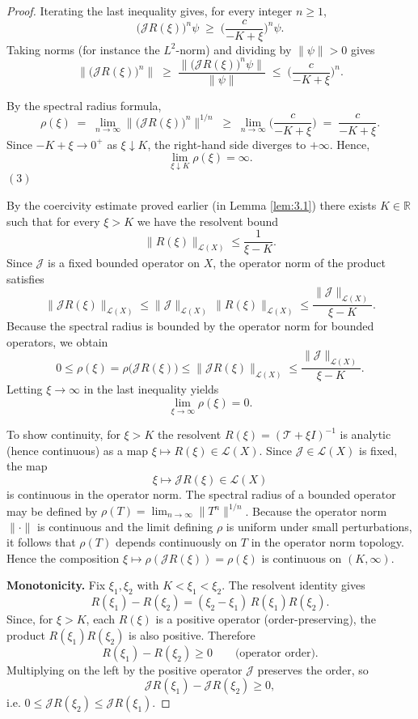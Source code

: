 \documentclass[a4paper,11pt]{amsart}
\theoremstyle{definition}
\numberwithin{equation}{section}
\theoremstyle{definition}
\begin{document}
\begin{proof}
\smallskip

Iterating the last inequality gives, for every integer \(n\geq1\),
\[
\big(\mathscr J R(\xi)\big)^n \psi \;\geq\; \Big(\frac{c}{-K+\xi}\Big)^n \psi.
\]
Taking norms (for instance the \(L^2\)-norm) and dividing by \(\|\psi\|>0\) gives
\[
\big\|\big(\mathscr J R(\xi)\big)^n\big\|
\;\geq\; \frac{\big\|\big(\mathscr J R(\xi)\big)^n\psi\big\|}{\|\psi\|}
\;\leq\; \Big(\frac{c}{-K+\xi}\Big)^n .
\]

 By the spectral radius formula,
\[
\rho(\xi) \;=\; \lim_{n\to\infty} \big\|\big(\mathscr J R(\xi)\big)^n\big\|^{1/n}
\;\geq\; \lim_{n\to\infty} \Big(\frac{c}{-K+\xi}\Big) \;=\; \frac{c}{-K+\xi}.
\]
Since \(-K+\xi\to 0^+\) as \(\xi\downarrow K\), the right-hand side diverges to \(+\infty\).
Hence,
\[
\lim_{\xi\downarrow K} \rho(\xi) = \infty.
\]
 $(3)$


By the coercivity estimate proved earlier (in Lemma \eqref{lem:3.1}) there exists $K\in\mathbb R$ such that for every $\xi>K$ we have the resolvent bound
\[
\|R(\xi)\|_{\mathcal L(X)} \leq \frac{1}{\xi-K}.
\]
Since $\mathscr J$ is a fixed bounded operator on $X$, the operator norm of the product satisfies
\[
\|\mathscr J R(\xi)\|_{\mathcal L(X)} \leq \|\mathscr J\|_{\mathcal L(X)} \,\|R(\xi)\|_{\mathcal L(X)}
\leq \frac{\|\mathscr J\|_{\mathcal L(X)}}{\xi-K}.
\]
Because the spectral radius is bounded by the operator norm for bounded operators, we obtain
\[
0 \le \rho(\xi) = \rho\!\big(\mathscr J R(\xi)\big) \leq \|\mathscr J R(\xi)\|_{\mathcal L(X)}
\leq \frac{\|\mathscr J\|_{\mathcal L(X)}}{\xi-K}.
\]
Letting $\xi\to\infty$ in the last inequality yields
\[
\lim_{\xi\to\infty}\rho(\xi)=0.
\]


To  show continuity, for $\xi>K$ the resolvent $R(\xi)=(\mathscr T+\xi I)^{-1}$ is analytic (hence continuous) as a map
\(\xi\mapsto R(\xi)\in\mathcal L(X)\). Since $\mathscr J\in\mathcal L(X)$ is fixed, the map
\[
\xi \longmapsto \mathscr J R(\xi) \in \mathcal L(X)
\]
is continuous in the operator norm. The spectral radius of a bounded operator may be defined by
\(\rho(T)=\lim_{n\to\infty}\|T^n\|^{1/n}\). Because the operator norm \(\|\cdot\|\) is continuous and the
limit defining \(\rho\) is uniform under small perturbations, it follows that \(\rho(T)\) depends continuously
on \(T\) in the operator norm topology. Hence the composition \(\xi\mapsto\rho(\mathscr J R(\xi))=\rho(\xi)\)
is continuous on \((K,\infty)\).

\medskip
\noindent\textbf{Monotonicity.}
Fix \(\xi_1,\xi_2\) with \(K<\xi_1<\xi_2\). The resolvent identity gives
\[
R(\xi_1)-R(\xi_2) = (\xi_2-\xi_1)\,R(\xi_1)R(\xi_2).
\]
Since, for \(\xi>K\), each \(R(\xi)\) is a positive operator (order-preserving), the product
\(R(\xi_1)R(\xi_2)\) is also positive. Therefore
\[
R(\xi_1)-R(\xi_2) \geq 0 \qquad\text{(operator order)}.
\]
Multiplying on the left by the positive operator \(\mathscr J\) preserves the order, so
\[
\mathscr J R(\xi_1) - \mathscr J R(\xi_2) \geq 0,
\]
i.e. \(0 \leq    \mathscr J R(\xi_2) \leq \mathscr J R(\xi_1)\).


\end{proof}
\end{document}
